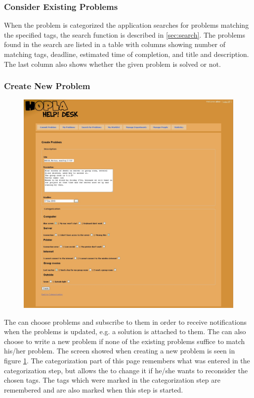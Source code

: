 \subsubsection{Consider Existing Problems}
\label{ssu:consider}
When the problem is categorized the application searches for problems matching the specified tags, the search function is described in \ref{sec:search}.
The problems found in the search are listed in a table with columns showing number of matching tags, deadline, estimated time of completion, and title and description.
The last column also shows whether the given problem is solved or not.

\subsubsection{Create New Problem}
\begin{figure}[htb]
	\centering
		\includegraphics[width=1.00\textwidth, clip=true, trim=2.9cm 0.5cm 15cm 8cm]{input/implementation/program_presentation/newProblem.png}
	\label{fig:newProblem}
\end{figure}
The \aclient[] can choose problems and subscribe to them in order to receive notifications when the problems is updated, e.g. a solution is attached to them.
The \aclient[] can also choose to write a new problem if none of the existing problems suffice to match his/her problem.
The screen showed when creating a new problem is seen in figure \ref{fig:newProblem}.
The categorization part of this page remembers what was entered in the categorization step, but allows the \aclient[] to change it if he/she wants to reconsider the chosen tags.
The tags which were marked in the categorization step are remembered and are also marked when this step is started.

